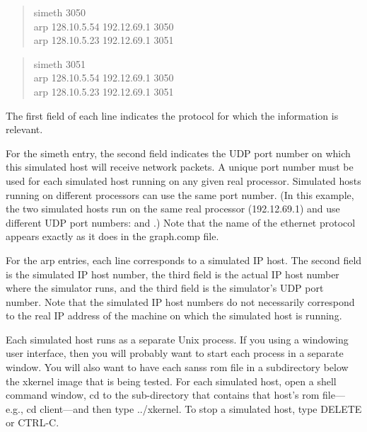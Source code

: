 \begin{quote}
\begin{tt}
simeth	3050\\
arp		128.10.5.54	192.12.69.1  3050\\
arp		128.10.5.23	192.12.69.1  3051\\
\end{tt}
\end{quote}

\begin{quote}
\begin{tt}
simeth	3051\\
arp	128.10.5.54     192.12.69.1  3050\\
arp	128.10.5.23	192.12.69.1  3051\\
\end{tt}
\end{quote}

\noindent
The first field of each line indicates the protocol for which the
information is relevant.

For the simeth entry, the second field indicates the UDP port number
on which this simulated host will receive network packets. A unique
port number must be used for each simulated host running on any given
real processor.  Simulated hosts running on different processors can
use the same port number. (In this example, the two simulated hosts
run on the same real processor (192.12.69.1) and use different UDP port
numbers: {} and {}.)  Note that the name of the
ethernet protocol appears exactly as it does in the {\sanss graph.comp}
file.

For the arp entries, each line corresponds to a simulated IP host.
The second field is the simulated IP host number, the third field is
the actual IP host number where the simulator runs, and the third
field is the simulator's UDP port number.  
Note that the simulated IP host numbers
do not necessarily correspond to the real IP address of the machine on
which the simulated host is running.

Each simulated host runs as a separate Unix process.  If you using a
windowing user interface, then you will probably want to start each
process in a separate window.  You will also want to have each {sanss
rom} file in a subdirectory below the xkernel image that is being
tested.  For each simulated host, open a shell command window, {\sanss
cd} to the sub-directory that contains that host's {\sanss rom}
file---e.g., {\sanss cd client}---and then type {\sanss ../xkernel}.
To stop a simulated host, type {\sanss DELETE} or {\sanss CTRL-C}.

